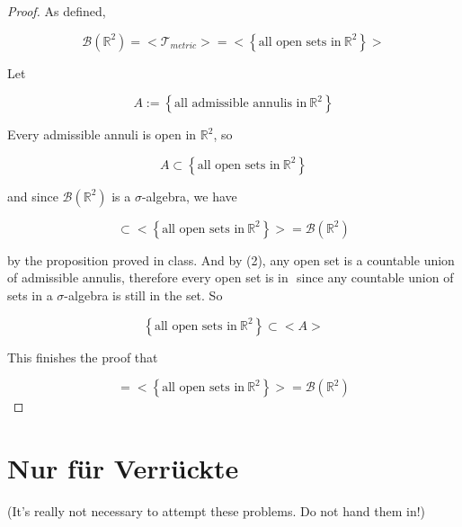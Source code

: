 \documentclass{qlnotes-export}
\begin{document}
\begin{proof}

As defined,

\[\mathcal{B}({\mathbb{R}}^{2}) = < \mathcal{T}_{metric} > = < \left\{ {\text{all open sets in}\ {\mathbb{R}}^{2}} \right\} >\]

Let

\[A := \left\{ {\text{all admissible annulis in}\ {\mathbb{R}}^{2}} \right\}\]

Every admissible annuli is open in \({\mathbb{R}}^{2}\), so

\[A \subset \left\{ {\text{all open sets in}\ {\mathbb{R}}^{2}} \right\}\]

and since \(\mathcal{B}({\mathbb{R}}^{2})\) is a \(\sigma\)-algebra, we have

\[< A > \subset < \left\{ {\text{all open sets in}\ {\mathbb{R}}^{2}} \right\} > = \mathcal{B}({\mathbb{R}}^{2})\]

by the proposition proved in class. And by (2), any open set is a countable union of admissible annulis, therefore every open set is in \(< A >\) since any countable union of sets in a \(\sigma\)-algebra is still in the set. So

\[\left\{ {\text{all open sets in}\ {\mathbb{R}}^{2}} \right\} \subset < A >\]

This finishes the proof that

\[< A > = < \left\{ {\text{all open sets in}\ {\mathbb{R}}^{2}} \right\} > = \mathcal{B}({\mathbb{R}}^{2})\]

\end{proof}

\section{Nur für Verrückte}\label{nur-fuxfcr-verruxfcckte}

(It's really not necessary to attempt these problems. Do not hand them in!)
\end{document}
